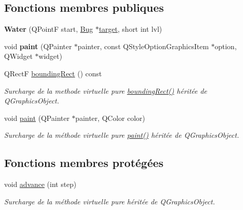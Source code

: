 \subsection*{Fonctions membres publiques}
\begin{DoxyCompactItemize}
\item 
\hypertarget{classWater_aee3bec8d65112f496fec8d8cb18cd9af}{
{\bfseries Water} (QPointF start, \hyperlink{classBug}{Bug} $\ast$\hyperlink{classProjectile_ae5273bd2c6550b94f38310b69859b093}{target}, short int lvl)}
\label{classWater_aee3bec8d65112f496fec8d8cb18cd9af}

\item 
\hypertarget{classWater_a1f8777c164bb06a357a78cabd9e790a2}{
void {\bfseries paint} (QPainter $\ast$painter, const QStyleOptionGraphicsItem $\ast$option, QWidget $\ast$widget)}
\label{classWater_a1f8777c164bb06a357a78cabd9e790a2}

\item 
QRectF \hyperlink{classProjectile_a0e0b18909c9c154404384707c6515802}{boundingRect} () const 
\begin{DoxyCompactList}\small\item\em Surcharge de la methode virtuelle pure \hyperlink{classProjectile_a0e0b18909c9c154404384707c6515802}{boundingRect()} héritée de QGraphicsObject. \end{DoxyCompactList}\item 
void \hyperlink{classProjectile_aef0d6ffcea7620988cf5446d0c1133fa}{paint} (QPainter $\ast$painter, QColor color)
\begin{DoxyCompactList}\small\item\em Surcharge de la méthode virtuelle pure \hyperlink{classProjectile_aef0d6ffcea7620988cf5446d0c1133fa}{paint()} héritée de QGraphicsObject. \end{DoxyCompactList}\end{DoxyCompactItemize}
\subsection*{Fonctions membres protégées}
\begin{DoxyCompactItemize}
\item 
void \hyperlink{classProjectile_a8e3b4bae49558a0febfce8c1accea72d}{advance} (int step)
\begin{DoxyCompactList}\small\item\em Surcharge de la méthode virtuelle pure héritée de QGraphicsObject. \end{DoxyCompactList}\end{DoxyCompactItemize}


